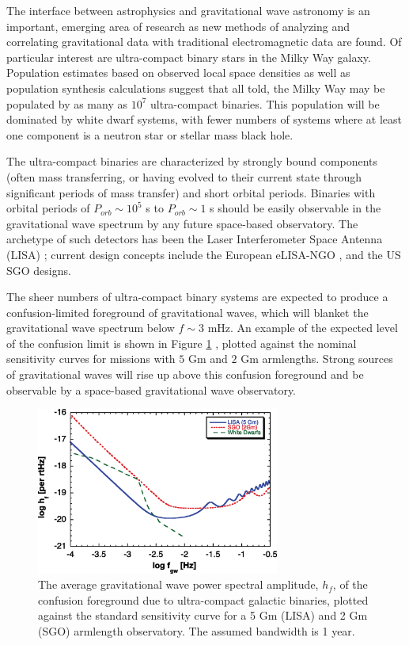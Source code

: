 \documentclass[preprint2]{aastex}
\begin{document}
The interface between astrophysics and gravitational wave astronomy is
an important, emerging area of research as new methods of analyzing
and correlating gravitational data with traditional electromagnetic
data are found.  Of particular interest are ultra-compact binary stars
in the Milky Way galaxy.  Population estimates based on observed local
space densities \citep{HBW,TRC} as well as population synthesis
calculations \citep{Nelemans1,Nelemans2,StarTrack} suggest that all
told, the Milky Way may be populated by as many as $10^{7}$
ultra-compact binaries.  This population will be dominated by white
dwarf systems, with fewer numbers of systems where at least one
component is a neutron star or stellar mass black hole.

The ultra-compact binaries are characterized by strongly bound
components (often mass transferring, or having evolved to their current
state through significant periods of mass transfer) and short orbital
periods.  Binaries with orbital periods of $P_{orb} \sim 10^{5}$ s to
$P_{orb} \sim 1$ s should be easily observable in the gravitational
wave spectrum by any future space-based observatory.  The archetype of
such detectors has been the Laser Interferometer Space Antenna (LISA)
\citep{LPPA}; current design concepts include the European eLISA-NGO
\citep{elisa}, and the US SGO \citep{SGOlow,SGOmid,SGOhi} designs.

The sheer numbers of ultra-compact binary systems are expected to
produce a confusion-limited foreground of gravitational waves, which
will blanket the gravitational wave spectrum below $f \sim 3$ mHz.  An
example of the expected level of the confusion limit is shown in
Figure \ref{fig.wdNoise} \citep{HilsBender}, plotted against the
nominal sensitivity curves \citep{SCG} for missions with $5$ Gm and
$2$ Gm armlengths.  Strong sources of gravitational waves will rise up
above this confusion foreground and be observable by a space-based
gravitational wave observatory.

\begin{figure}[h]
\centering
\includegraphics[width=80mm]{./figs/lisastandard.eps}
  \caption{The average gravitational wave power spectral amplitude,
  $h_{f}$, of the confusion foreground due to ultra-compact galactic
  binaries, plotted against the standard sensitivity curve \citep{SCG}
  for a 5 Gm (LISA) and 2 Gm (SGO) armlength observatory.  The assumed
  bandwidth is 1 year.}
  \label{fig.wdNoise}
\end{figure}
\end{document}
